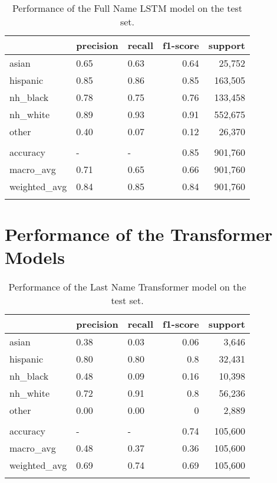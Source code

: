 \documentclass[12pt, letterpaper]{article}
\begin{document}
\begin{table}[h!]
\centering
\caption{Performance of the Full Name LSTM model on the test set.}
\begin{tabular}{lllrr}
\hline
              & precision   & recall   &   f1-score &   support \\
\hline
 asian        & 0.65        & 0.63     &       0.64 &     25,752 \\
 hispanic     & 0.85        & 0.86     &       0.85 &    163,505 \\
 nh\_black     & 0.78        & 0.75     &       0.76 &    133,458 \\
 nh\_white     & 0.89        & 0.93     &       0.91 &    552,675 \\
 other        & 0.40        & 0.07     &       0.12 &     26,370 \\
              &             &          &            &           \\
 accuracy     & -           & -        &       0.85 &    901,760 \\
 macro\_avg    & 0.71        & 0.65     &       0.66 &    901,760 \\
 weighted\_avg & 0.84        & 0.85     &       0.84 &    901,760 \\
\hline
\label{table:lstm_full_name}
\end{tabular}
\end{table}

\clearpage
\section{Performance of the Transformer Models}\label{transformer_perf}

\begin{table}[h!]
\centering
\caption{Performance of the Last Name Transformer model on the test set.}
\begin{tabular}{lllrr}
\hline
              & precision   & recall   &   f1-score &   support \\
\hline
 asian        & 0.38        & 0.03     &       0.06 &      3,646 \\
 hispanic     & 0.80        & 0.80     &       0.8  &     32,431 \\
 nh\_black     & 0.48        & 0.09     &       0.16 &     10,398 \\
 nh\_white     & 0.72        & 0.91     &       0.8  &     56,236 \\
 other        & 0.00        & 0.00     &       0    &      2,889 \\
              &             &          &            &           \\
 accuracy     & -           & -        &       0.74 &    105,600 \\
 macro\_avg    & 0.48        & 0.37     &       0.36 &    105,600 \\
 weighted\_avg & 0.69        & 0.74     &       0.69 &    105,600 \\
\hline
\label{table:transformer_last_name}
\end{tabular}
\end{table}
\end{document}

